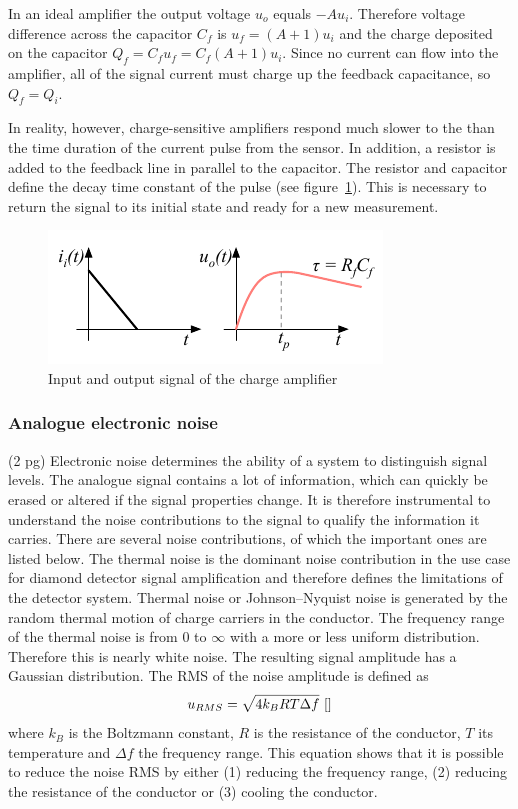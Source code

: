 \documentclass[twoside,12pt]{packages/mytustyle}  %
\begin{document}
In an ideal amplifier the output voltage $u_o$ equals $-Au_i$. Therefore voltage difference across the capacitor $C_f$ is $u_f=(A+1)u_i$ and the charge deposited on the capacitor $Q_f=C_f u_f = C_f (A+1)u_i$. Since no current can flow into the amplifier, all of the signal current must charge up the feedback capacitance, so $Q_f = Q_i$.

In reality, however, charge-sensitive amplifiers respond much slower to the than the time duration of the current pulse from the sensor. In addition, a resistor is added to the feedback line in parallel to the capacitor. The resistor and capacitor define the decay time constant of the pulse (see figure~\ref{fig:chgrc}). This is necessary to return the signal to its initial state and ready for a new measurement.
\begin{figure}[!t]
\begin{center}
\includegraphics[width=0.45\linewidth]{plots/chgrc}
\caption{Input and output signal of the charge amplifier}
\label{fig:chgrc}
\end{center}
\end{figure}

\subsubsection{Analogue electronic noise}
(2 pg)
Electronic noise determines the ability of a system to distinguish signal levels. The analogue signal contains a lot of information, which can quickly be erased or altered if the signal properties change. It is therefore instrumental to understand the noise contributions to the signal to qualify the information it carries. There are several noise contributions, of which the important ones are listed below. The thermal noise is the dominant noise contribution in the use case for diamond detector signal amplification and therefore defines the limitations of the detector system. Thermal noise or Johnson--Nyquist noise is generated by the random thermal motion of charge carriers in the conductor. The frequency range of the thermal noise is from 0 to $\infty$ with a more or less uniform distribution. Therefore this is nearly white noise. The resulting signal amplitude has a Gaussian distribution. The RMS of the noise amplitude is defined as
\begin{equation}
\label{eq:thermnoise}
u_{RMS}=\sqrt{4k_BRT\Delta f}~\cite{}
\end{equation}
where $k_B$ is the Boltzmann constant, $R$ is the resistance of the conductor, $T$ its temperature and $\Delta f$ the frequency range. This equation shows that it is possible to reduce the noise RMS by either (1) reducing the frequency range, (2) reducing the resistance of the conductor or (3) cooling the conductor. 
\end{document}
